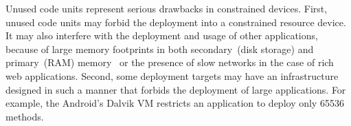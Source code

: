 %
%

Unused code units represent serious drawbacks in constrained devices. 
First, unused code units may forbid the deployment into a constrained resource device.
It may also interfere with the deployment and usage of other applications, because of large memory footprints in both secondary~(disk storage) and primary~(RAM) memory~\cite{Mart12a} or the presence of slow networks in the case of rich web applications.
Second, some deployment targets may have an infrastructure designed in such a manner that forbids the deployment of large applications. For example, the Android's Dalvik VM restricts an application to deploy only 65536 methods.




